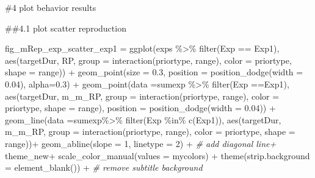 \documentclass[
]{article}
\newenvironment{Shaded}{\begin{snugshade}}{\end{snugshade}}
\newcommand{\AttributeTok}[1]{\textcolor[rgb]{0.77,0.63,0.00}{#1}}
\newcommand{\CommentTok}[1]{\textcolor[rgb]{0.56,0.35,0.01}{\textit{#1}}}
\newcommand{\DecValTok}[1]{\textcolor[rgb]{0.00,0.00,0.81}{#1}}
\newcommand{\FloatTok}[1]{\textcolor[rgb]{0.00,0.00,0.81}{#1}}
\newcommand{\FunctionTok}[1]{\textcolor[rgb]{0.00,0.00,0.00}{#1}}
\newcommand{\NormalTok}[1]{#1}
\newcommand{\OtherTok}[1]{\textcolor[rgb]{0.56,0.35,0.01}{#1}}
\newcommand{\SpecialCharTok}[1]{\textcolor[rgb]{0.00,0.00,0.00}{#1}}
\newcommand{\StringTok}[1]{\textcolor[rgb]{0.31,0.60,0.02}{#1}}
\begin{document}
\#4 plot behavior results

\#\#4.1 plot scatter reproduction

\begin{Shaded}
\begin{Highlighting}[]
\NormalTok{fig\_mRep\_exp\_scatter\_exp1 }\OtherTok{=} \FunctionTok{ggplot}\NormalTok{(exps }\SpecialCharTok{\%\textgreater{}\%} \FunctionTok{filter}\NormalTok{(Exp }\SpecialCharTok{==} \StringTok{\textquotesingle{}Exp1\textquotesingle{}}\NormalTok{),}
                                   \FunctionTok{aes}\NormalTok{(targetDur, RP, }\AttributeTok{group =} \FunctionTok{interaction}\NormalTok{(priortype, range), }\AttributeTok{color =}\NormalTok{ priortype, }\AttributeTok{shape =}\NormalTok{ range)) }\SpecialCharTok{+} 
  \FunctionTok{geom\_point}\NormalTok{(}\AttributeTok{size =} \FloatTok{0.3}\NormalTok{, }\AttributeTok{position =} \FunctionTok{position\_dodge}\NormalTok{(}\AttributeTok{width =} \FloatTok{0.04}\NormalTok{), }\AttributeTok{alpha=}\FloatTok{0.3}\NormalTok{) }\SpecialCharTok{+} 
  \FunctionTok{geom\_point}\NormalTok{(}\AttributeTok{data =}\NormalTok{sumexp }\SpecialCharTok{\%\textgreater{}\%} \FunctionTok{filter}\NormalTok{(Exp }\SpecialCharTok{==}\StringTok{\textquotesingle{}Exp1\textquotesingle{}}\NormalTok{), }\FunctionTok{aes}\NormalTok{(targetDur, m\_m\_RP, }\AttributeTok{group =} \FunctionTok{interaction}\NormalTok{(priortype, range), }\AttributeTok{color =}\NormalTok{ priortype, }\AttributeTok{shape =}\NormalTok{ range),  }\AttributeTok{position =} \FunctionTok{position\_dodge}\NormalTok{(}\AttributeTok{width =} \FloatTok{0.04}\NormalTok{)) }\SpecialCharTok{+} 
  \FunctionTok{geom\_line}\NormalTok{(}\AttributeTok{data =}\NormalTok{sumexp}\SpecialCharTok{\%\textgreater{}\%} \FunctionTok{filter}\NormalTok{(Exp }\SpecialCharTok{\%in\%} \FunctionTok{c}\NormalTok{(}\StringTok{\textquotesingle{}Exp1\textquotesingle{}}\NormalTok{)), }\FunctionTok{aes}\NormalTok{(targetDur, m\_m\_RP, }\AttributeTok{group =} \FunctionTok{interaction}\NormalTok{(priortype, range), }\AttributeTok{color =}\NormalTok{ priortype, }\AttributeTok{shape =}\NormalTok{ range))}\SpecialCharTok{+} 
  \FunctionTok{geom\_abline}\NormalTok{(}\AttributeTok{slope =} \DecValTok{1}\NormalTok{, }\AttributeTok{linetype =} \DecValTok{2}\NormalTok{) }\SpecialCharTok{+} \CommentTok{\# add diagonal line+}
\NormalTok{  theme\_new}\SpecialCharTok{+} 
  \FunctionTok{scale\_color\_manual}\NormalTok{(}\AttributeTok{values =}\NormalTok{ mycolors) }\SpecialCharTok{+}
  \FunctionTok{theme}\NormalTok{(}\AttributeTok{strip.background =} \FunctionTok{element\_blank}\NormalTok{()) }\SpecialCharTok{+} \CommentTok{\# remove subtitle background}

\end{Highlighting}
\end{Shaded}
\end{document}
